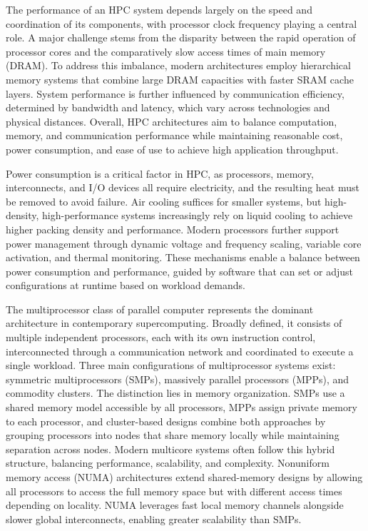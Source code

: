 The performance of an HPC system depends largely on the speed and coordination of its components, with processor clock frequency playing a central role. A major challenge stems from the disparity between the rapid operation of processor cores and the comparatively slow access times of main memory (DRAM). To address this imbalance, modern architectures employ hierarchical memory systems that combine large DRAM capacities with faster SRAM cache layers. System performance is further influenced by communication efficiency, determined by bandwidth and latency, which vary across technologies and physical distances. Overall, HPC architectures aim to balance computation, memory, and communication performance while maintaining reasonable cost, power consumption, and ease of use to achieve high application throughput.

Power consumption is a critical factor in HPC, as processors, memory, interconnects, and I/O devices all require electricity, and the resulting heat must be removed to avoid failure. Air cooling suffices for smaller systems, but high-density, high-performance systems increasingly rely on liquid cooling to achieve higher packing density and performance. Modern processors further support power management through dynamic voltage and frequency scaling, variable core activation, and thermal monitoring. These mechanisms enable a balance between power consumption and performance, guided by software that can set or adjust configurations at runtime based on workload demands.

The multiprocessor class of parallel computer represents the dominant architecture in contemporary supercomputing. Broadly defined, it consists of multiple independent processors, each with its own instruction control, interconnected through a communication network and coordinated to execute a single workload. Three main configurations of multiprocessor systems exist: symmetric multiprocessors (SMPs), massively parallel processors (MPPs), and commodity clusters. The distinction lies in memory organization. SMPs use a shared memory model accessible by all processors, MPPs assign private memory to each processor, and cluster-based designs combine both approaches by grouping processors into nodes that share memory locally while maintaining separation across nodes. Modern multicore systems often follow this hybrid structure, balancing performance, scalability, and complexity.
Nonuniform memory access (NUMA) architectures extend shared-memory designs by allowing all processors to access the full memory space but with different access times depending on locality. NUMA leverages fast local memory channels alongside slower global interconnects, enabling greater scalability than SMPs.

